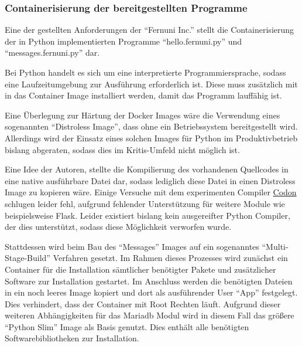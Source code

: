 \subsubsection{Containerisierung der bereitgestellten Programme}

Eine der gestellten Anforderungen der \enquote{Fernuni Inc.} stellt die Containerisierung der in Python implementierten Programme \enquote{hello.fernuni.py} und \enquote{messages.fernuni.py} dar.

Bei Python handelt es sich um eine interpretierte Programmiersprache, sodass eine Laufzeitumgebung zur Ausführung erforderlich ist. Diese muss zusätzlich mit in das Container Image installiert werden, damit das Programm lauffähig ist.

Eine Überlegung zur Härtung der Docker Images wäre die Verwendung eines sogenannten \enquote{Distroless Image}, dass ohne ein Betriebssystem bereitgestellt wird. Allerdings wird der Einsatz eines solchen Images für Python im Produktivbetrieb bislang abgeraten, sodass dies im Kritis-Umfeld nicht möglich ist.

Eine Idee der Autoren, stellte die Kompilierung des vorhandenen Quellcodes in eine native ausführbare Datei dar, sodass lediglich diese Datei in einen Distroless Image zu kopieren wäre. Einige Versuche mit dem experimenten Compiler \href{https://github.com/exaloop/codon}{Codon} schlugen leider fehl, aufgrund fehlender Unterstützung für weitere Module wie beispielsweise Flask. Leider existiert bislang kein ausgereifter Python Compiler, der dies unterstützt, sodass diese Möglichkeit verworfen wurde.

Stattdessen wird beim Bau des \enquote{Messages} Images auf ein sogenanntes \enquote{Multi-Stage-Build} Verfahren gesetzt. Im Rahmen dieses Prozesses wird zunächst ein Container für die Installation sämtlicher benötigter Pakete und zusätzlicher Software zur Installation gestartet. Im Anschluss werden die benötigten Dateien in ein noch leeres Image kopiert und dort als ausführender User \enquote{App} festgelegt. Dies verhindert, dass der Container mit Root Rechten läuft. Aufgrund dieser weiteren Abhängigkeiten für das Mariadb Modul wird in diesem Fall das größere \enquote{Python Slim} Image als Basis genutzt. Dies enthält alle benötigten Softwarebibliotheken zur Installation.

